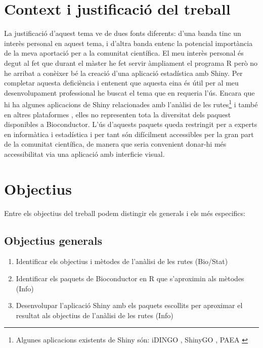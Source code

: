 \section{Context i justificació del treball}
La justificació d'aquest tema ve de dues fonts diferents: d'una banda tinc un interès personal en aquest tema, i d'altra banda entenc la potencial importància de la meva aportació per a la comunitat científica. El meu interès personal és degut al fet que durant el màster he fet servir àmpliament el programa R però no he arribat a conèixer bé la creació d'una aplicació estadística amb Shiny. Per completar aquesta deficiència i entenent que aquesta eina és útil per al meu desenvolupament professional he buscat el tema que en requeria l'ús. Encara que hi ha algunes aplicacions de Shiny relacionades amb l'anàlisi de les rutes\footnote{Algunes aplicacions existents de Shiny són: iDINGO \cite{class2017idingo}, ShinyGO \cite{ge2018shinygo}, PAEA \cite{clark2015principle}} i també en altres plataformes \cite{reimand2019pathway}, elles no representen tota la diversitat dels paquest disponibles a \gls{Bioconductor}. L'ús d'aquests paquets queda restringit per a experts en informàtica i estadística i per tant són difícilment accessibles per la gran part de la comunitat científica, de manera que seria convenient donar-hi més accessibilitat via una aplicació amb interficie visual. 


\section{Objectius}

Entre els objectius del treball podem distingir els generals i els més especifics:
\subsection{Objectius generals}
\begin{enumerate}
\item Identificar els objectius i mètodes de l'anàlisi de les rutes (Bio/Stat)
\item Identificar els paquets de \gls{Bioconductor} en R que s'aproximin als mètodes (Info)
\item Desenvolupar l'aplicació Shiny amb els paquets escollits per aproximar el resultat als objectius de l'anàlisi de les rutes (Info)
\end{enumerate}

